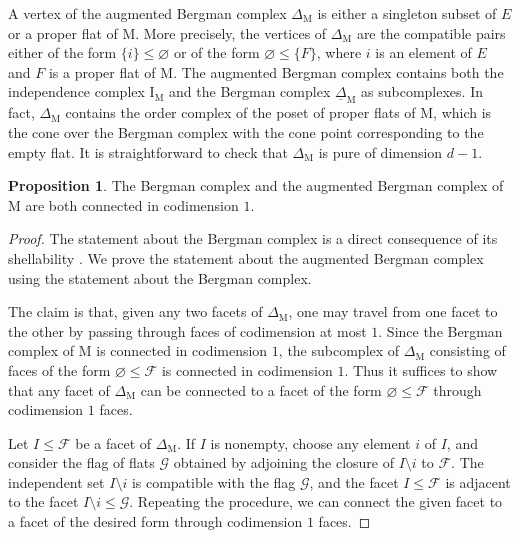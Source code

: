 \documentclass[11pt,reqno]{amsart}
\theoremstyle{definition}
\newtheorem{proposition}[theorem]{Proposition}
\theoremstyle{remark}
\renewcommand{\(}{\left(}
\renewcommand{\)}{\right)}
\newcommand{\<}{\left<}
\renewcommand{\>}{\right>}
\begin{document}
A vertex of the augmented Bergman complex $\Delta_\mathrm{M}$ is either a singleton subset of $E$ or a proper flat of $\mathrm{M}$.
More precisely, the vertices of $\Delta_\mathrm{M}$ are the compatible pairs either of the form $\{i\} \le \varnothing$ or of the 
form $\varnothing \le \{F\}$, where
$i$ is an element of $E$ and $F$ is a proper flat of $\mathrm{M}$.
The augmented Bergman complex  contains both the independence complex $\mathrm{I}_\mathrm{M}$
and the Bergman complex $\underline{\Delta}_\mathrm{M}$ as subcomplexes.
In fact, $\Delta_\mathrm{M}$  contains the order complex of the poset of proper flats of $\mathrm{M}$, which is
the cone over  the Bergman complex with the cone point corresponding to the empty flat.
It is straightforward to check that $\Delta_\mathrm{M}$ is pure of dimension $d-1$.

\begin{proposition}\label{PropositionConnected}
The Bergman complex and the augmented Bergman complex of $\mathrm{M}$ are both connected in codimension $1$.
\end{proposition}

\begin{proof}
The statement about the Bergman complex is a direct consequence of its shellability \cite{Bjorner}.
We prove the statement about the augmented Bergman complex using the statement about the Bergman complex.

The claim is that, given any two facets of $\Delta_\mathrm{M}$, one may travel from one facet to the other by passing through faces of codimension at most $1$.
Since the Bergman complex of $\mathrm{M}$ is connected in codimension $1$, the subcomplex of $\Delta_\mathrm{M}$ consisting of faces of the form $\varnothing \le \mathscr{F}$ is connected in codimension $1$.
Thus it suffices to show that any  facet of  $\Delta_\mathrm{M}$ can be connected to a facet of the form $\varnothing\le \mathscr{F}$ through codimension $1$ faces.

Let $I \le \mathscr{F}$ be a facet of $\Delta_{\mathrm{M}}$.
If $I$ is nonempty, choose any element $i$ of $I$, and consider the flag of flats $\mathscr{G}$ obtained by adjoining the closure of $I\setminus i$  to $\mathscr{F}$.
The independent set $I \setminus i$ is compatible with the flag $\mathscr{G}$, and the facet $I \le \mathscr{F}$ is adjacent to the facet
$I\setminus i \le \mathscr{G}$.
Repeating the procedure,
we can connect the given facet to a facet of the desired form through codimension $1$ faces.
\end{proof}
\end{document}
